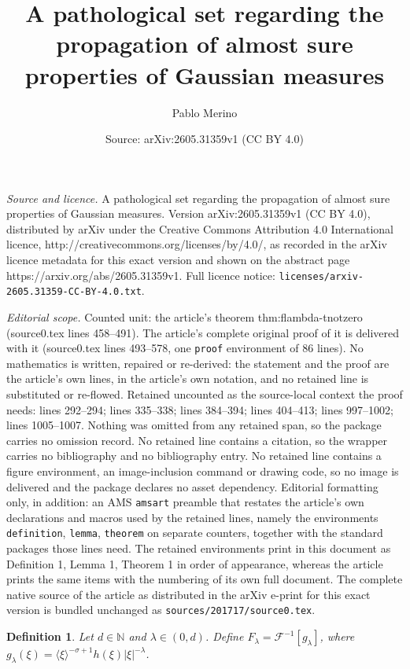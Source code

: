 \documentclass[10pt,a4paper]{amsart}
\title{A pathological set regarding the propagation of almost sure properties of Gaussian measures}
\author{Pablo Merino}
\date{Source: arXiv:2605.31359v1 (CC BY 4.0)}
\newtheorem{definition}{Definition}
\begin{document}
\maketitle

\noindent\emph{Source and licence.} A pathological set regarding the propagation of almost sure properties of Gaussian measures. Version arXiv:2605.31359v1 (CC BY 4.0), distributed by arXiv under the Creative Commons Attribution 4.0 International licence, http://creativecommons.org/licenses/by/4.0/, as recorded in the arXiv licence metadata for this exact version and shown on the abstract page https://arxiv.org/abs/2605.31359v1. Full licence notice: \texttt{licenses/arxiv-2605.31359-CC-BY-4.0.txt}.\par\smallskip

\noindent\textit{Editorial scope.} Counted unit: the article's theorem thm:flambda-tnotzero (source0.tex lines 458--491). The article's complete original proof of it is delivered with it (source0.tex lines 493--578, one \texttt{proof} environment of 86 lines). No mathematics is written, repaired or re-derived: the statement and the proof are the article's own lines, in the article's own notation, and no retained line is substituted or re-flowed.  Retained uncounted as the source-local context the proof needs: lines 292--294; lines 335--338; lines 384--394; lines 404--413; lines 997--1002; lines 1005--1007.  Nothing was omitted from any retained span, so the package carries no omission record.  No retained line contains a citation, so the wrapper carries no bibliography and no bibliography entry.  No retained line contains a figure environment, an image-inclusion command or drawing code, so no image is delivered and the package declares no asset dependency.  Editorial formatting only, in addition: an AMS \texttt{amsart} preamble that restates the article's own declarations and macros used by the retained lines, namely the environments \texttt{definition}, \texttt{lemma}, \texttt{theorem} on separate counters, together with the standard packages those lines need.  The retained environments print in this document as Definition 1, Lemma 1, Theorem 1 in order of appearance, whereas the article prints the same items with the numbering of its own full document.  The complete native source of the article as distributed in the arXiv e-print for this exact version is bundled unchanged as \texttt{sources/201717/source0.tex}.
\begin{definition}\label{def:g-lambda}
Let $d \in \mathbb{N}$ and $\lambda \in (0,d)$. Define $F_{\lambda} = \mathcal{F}^{-1}[g_{\lambda}]$, where $g_{\lambda}(\xi) = \langle \xi \rangle^{-\sigma+1} h(\xi)|\xi|^{-\lambda}$.
\end{definition}
\end{document}
